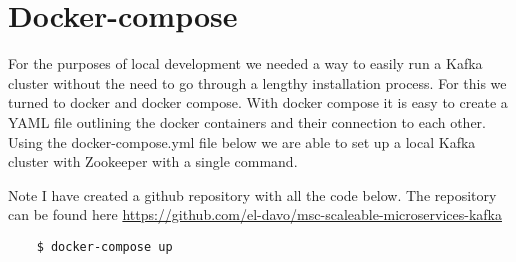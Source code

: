 \section{Docker-compose}

For the purposes of local development we needed a way to easily run a Kafka cluster without the need to go through a lengthy installation process. For this we turned to docker and docker compose. With docker compose it is easy to create a YAML file outlining the docker containers and their connection to each other. Using the docker-compose.yml file below we are able to set up a local Kafka cluster with Zookeeper with a single command.

Note I have created a github repository with all the code below. The repository can be found here \href{https://github.com/el-davo/msc-scaleable-microservices-kafka}{https://github.com/el-davo/msc-scaleable-microservices-kafka}

\begin{verbatim}
	$ docker-compose up
\end{verbatim}


